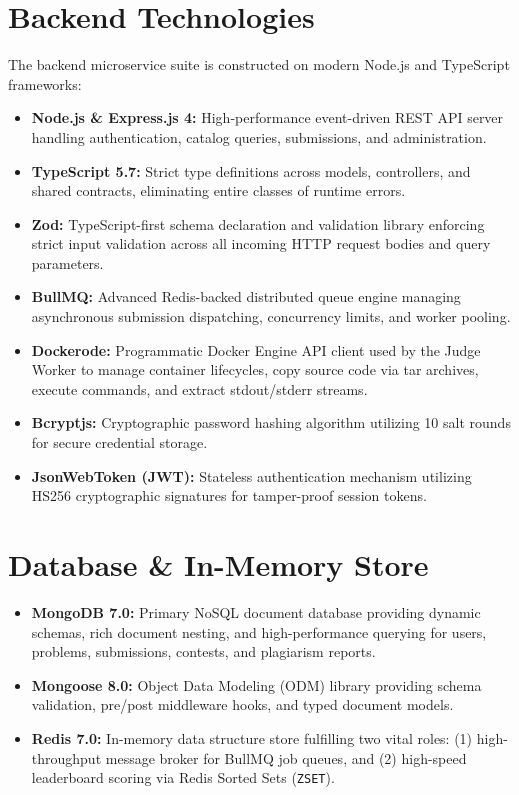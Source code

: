 \documentclass[12pt,a4paper]{report}
\begin{document}
\section{Backend Technologies}
The backend microservice suite is constructed on modern Node.js and TypeScript frameworks:
\begin{itemize}[leftmargin=*]
  \item \textbf{Node.js \& Express.js 4:} High-performance event-driven REST API server handling authentication, catalog queries, submissions, and administration.
  \item \textbf{TypeScript 5.7:} Strict type definitions across models, controllers, and shared contracts, eliminating entire classes of runtime errors.
  \item \textbf{Zod:} TypeScript-first schema declaration and validation library enforcing strict input validation across all incoming HTTP request bodies and query parameters.
  \item \textbf{BullMQ:} Advanced Redis-backed distributed queue engine managing asynchronous submission dispatching, concurrency limits, and worker pooling.
  \item \textbf{Dockerode:} Programmatic Docker Engine API client used by the Judge Worker to manage container lifecycles, copy source code via tar archives, execute commands, and extract stdout/stderr streams.
  \item \textbf{Bcryptjs:} Cryptographic password hashing algorithm utilizing 10 salt rounds for secure credential storage.
  \item \textbf{JsonWebToken (JWT):} Stateless authentication mechanism utilizing HS256 cryptographic signatures for tamper-proof session tokens.
\end{itemize}

\section{Database \& In-Memory Store}
\begin{itemize}[leftmargin=*]
  \item \textbf{MongoDB 7.0:} Primary NoSQL document database providing dynamic schemas, rich document nesting, and high-performance querying for users, problems, submissions, contests, and plagiarism reports.
  \item \textbf{Mongoose 8.0:} Object Data Modeling (ODM) library providing schema validation, pre/post middleware hooks, and typed document models.
  \item \textbf{Redis 7.0:} In-memory data structure store fulfilling two vital roles: (1) high-throughput message broker for BullMQ job queues, and (2) high-speed leaderboard scoring via Redis Sorted Sets (\texttt{ZSET}).
\end{itemize}
\end{document}
